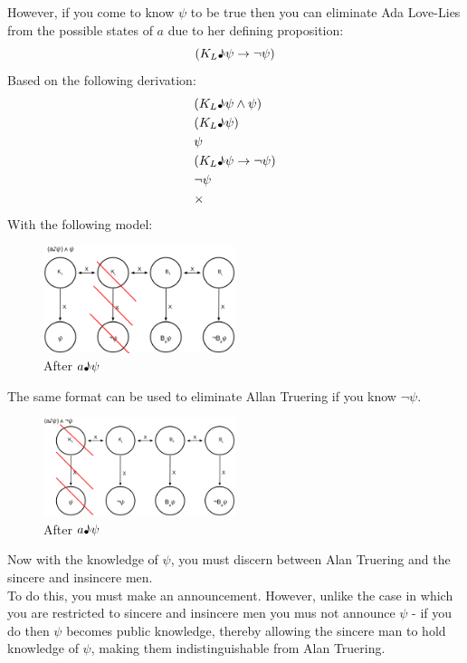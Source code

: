 \documentclass[12pt, titlepage, twoside, a4paper]{report}
\begin{document}
However, if you come to know $\psi$ to be true then you can eliminate Ada Love-Lies from the possible states of $a$ due to her defining proposition: 
$$(K_L \text{\textmusicalnote} \psi \to \neg \psi)$$
Based on the following derivation:\\
\begin{align*}
&(K_L \text{\textmusicalnote} \psi \wedge \psi )\\
&(K_L \text{\textmusicalnote} \psi )\\
&\psi \\
&(K_L \text{\textmusicalnote} \psi \to \neg \psi )\\
&\neg \psi \\
&\times
\end{align*}\newline \newline \newline
With the following model:\newline
\begin{figure}[h!]
  \centering
  \includegraphics[width=0.5\textwidth]{slide41.eps}
  \caption{After $a \text{\textmusicalnote} \psi$}
\end{figure}\newline
The same format can be used to eliminate Allan Truering if you know $\neg \psi$.\\
\begin{figure}[h!]
  \centering
  \includegraphics[width=0.5\textwidth]{slide42.eps}
  \caption{After $a \text{\textmusicalnote} \psi$}
\end{figure}\newline
Now with the knowledge of $\psi$, you must discern between Alan Truering and the sincere and insincere men.\\
To do this, you must make an announcement. However, unlike the case in which you are restricted to sincere and insincere men you mus not announce $\psi$ - if you do then $\psi$ becomes public knowledge, thereby allowing the sincere man to hold knowledge of $\psi$, making them indistinguishable from Alan Truering.\\
\end{document}
